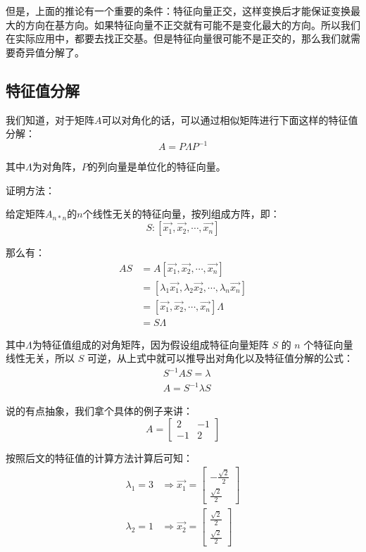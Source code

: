 \documentclass[12pt]{article}
\begin{document}
但是，上面的推论有一个重要的条件：特征向量正交，这样变换后才能保证变换最大的方向在基方向。如果特征向量不正交就有可能不是变化最大的方向。所以我们在实际应用中，都要去找正交基。但是特征向量很可能不是正交的，那么我们就需要奇异值分解了。

\subsection{特征值分解}
我们知道，对于矩阵$A$可以对角化的话，可以通过相似矩阵进行下面这样的特征值分解：
$$
A = P\Lambda P^{-1}
$$

其中$\Lambda$为对角阵，$P$的列向量是单位化的特征向量。

\begin{framed}  
\small{
证明方法：

给定矩阵$A_{n*n}$的$n$个线性无关的特征向量，按列组成方阵，即：
$$
S: [\vec{x_1}, \vec{x_2}, \cdots, \vec{x_n}]
$$

那么有：
\begin{align*}
    AS &= A[\vec{x_1}, \vec{x_2}, \cdots, \vec{x_n}] \\
    &= [\lambda_1\vec{x_1}, \lambda_2\vec{x_2}, \cdots, \lambda_n\vec{x_n}] \\
    &= [\vec{x_1}, \vec{x_2}, \cdots, \vec{x_n}] \Lambda \\
    &= S\Lambda
\end{align*}

其中$\Lambda$为特征值组成的对角矩阵，因为假设组成特征向量矩阵 $S$ 的 $n$ 个特征向量线性无关，所以 $S$ 可逆，从上式中就可以推导出对角化以及特征值分解的公式：
\begin{align*}
    &S^{-1}AS = \lambda \\
    &A = S^{-1}\lambda S
\end{align*}
}
\end{framed}

说的有点抽象，我们拿个具体的例子来讲：
$$
A= \begin{bmatrix}
2&-1\\-1&2
\end{bmatrix}
$$

按照后文的特征值的计算方法计算后可知：
\begin{align*}
    \lambda_1 = 3 &\Rightarrow \vec{x_1} = \begin{bmatrix}
    -\frac{\sqrt{2}}{2} \\ \frac{\sqrt{2}}{2}
    \end{bmatrix} \\
    \lambda_2 = 1 &\Rightarrow \vec{x_2} = \begin{bmatrix}
    \frac{\sqrt{2}}{2} \\ \frac{\sqrt{2}}{2}
    \end{bmatrix}
\end{align*}
\end{document}
